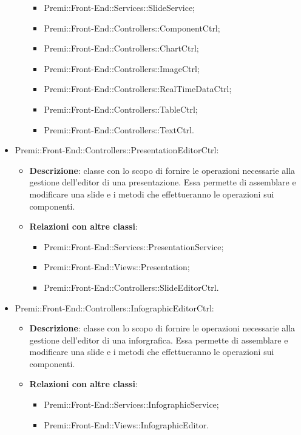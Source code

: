 \begin{itemize}
\begin{itemize}
\begin{itemize}
			\item Premi::Front-End::Services::SlideService;
			\item Premi::Front-End::Controllers::ComponentCtrl;
			\item Premi::Front-End::Controllers::ChartCtrl;
			\item Premi::Front-End::Controllers::ImageCtrl;
			\item Premi::Front-End::Controllers::RealTimeDataCtrl;
			\item Premi::Front-End::Controllers::TableCtrl;
			\item Premi::Front-End::Controllers::TextCtrl.
		\end{itemize}
	\end{itemize}
	\item  Premi::Front-End::Controllers::PresentationEditorCtrl:
	\begin{itemize}
		\item \textbf{Descrizione}: classe con lo scopo di fornire le operazioni necessarie alla gestione dell'editor di una presentazione. Essa permette di assemblare e modificare una \gls{slide} e i metodi che effettueranno le operazioni sui componenti.
		\item \textbf{Relazioni con altre classi}:
		\begin{itemize}
			\item Premi::Front-End::Services::PresentationService;
			\item Premi::Front-End::Views::Presentation;
			\item Premi::Front-End::Controllers::SlideEditorCtrl.
		\end{itemize}
	\end{itemize}
	\item  Premi::Front-End::Controllers::InfographicEditorCtrl:
	\begin{itemize}
		\item \textbf{Descrizione}: classe con lo scopo di fornire le operazioni necessarie alla gestione dell'editor di una inforgrafica. Essa permette di assemblare e modificare una \gls{slide} e i metodi che effettueranno le operazioni sui componenti.
		\item \textbf{Relazioni con altre classi}:
		\begin{itemize}
			\item Premi::Front-End::Services::InfographicService;
			\item Premi::Front-End::Views::InfographicEditor.
		\end{itemize}
	\end{itemize}

\end{itemize}
